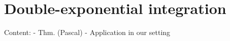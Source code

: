 \documentclass[main.tex]{subfiles}
\begin{document}
  \section{Double-exponential integration}\label{sec:de_int}

  Content: - Thm. (Pascal)
	   - Application in our setting

\biblio
\end{document}
